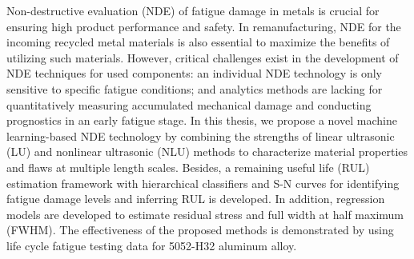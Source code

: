 Non-destructive evaluation (NDE) of fatigue damage in metals is crucial for ensuring high product performance and safety. In remanufacturing, NDE for the incoming recycled metal materials is also essential to maximize the benefits of utilizing such materials. However, critical challenges exist in the development of NDE techniques for used components: an individual NDE technology is only sensitive to specific fatigue conditions; and analytics methods are lacking for quantitatively measuring accumulated mechanical damage and conducting prognostics in an early fatigue stage. In this thesis, we propose a novel machine learning-based NDE technology by combining the strengths of linear ultrasonic (LU) and nonlinear ultrasonic (NLU) methods to characterize material properties and flaws at multiple length scales. Besides, a remaining useful life (RUL) estimation framework with hierarchical classifiers and S-N curves for identifying fatigue damage levels and inferring RUL is developed. In addition, regression models are developed to estimate residual stress and full width at half maximum (FWHM). The effectiveness of the proposed methods is demonstrated by using life cycle fatigue testing data for 5052-H32 aluminum alloy.


